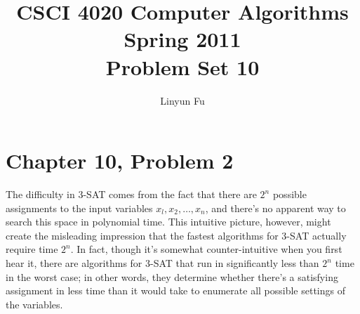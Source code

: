 \documentclass[12pt,letterpaper]{article}
\author{Linyun Fu}
\title{CSCI 4020 Computer Algorithms Spring 2011\\
Problem Set 10}
\begin{document}
\maketitle
\section*{Chapter 10, Problem 2}
The difficulty in 3-SAT comes from the fact that there are $2^n$ possible
assignments to the input variables $x_l, x_2, \dots, x_n$, and there's no apparent
way to search this space in polynomial time. This intuitive picture, however,
might create the misleading impression that the fastest algorithms
for 3-SAT actually require time $2^n$. In fact, though it's somewhat counter-intuitive
when you first hear it, there are algorithms for 3-SAT that run
in significantly less than $2^n$ time in the worst case; in other words, they determine whether there's a satisfying assignment in less time than it
would take to enumerate all possible settings of the variables.
\end{document}
